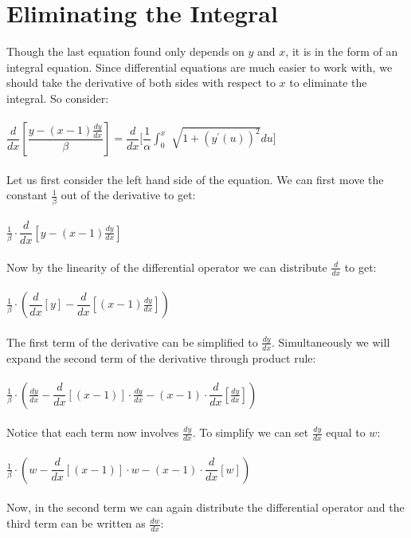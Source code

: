 \documentclass[12pt]{article}
\begin{document}
	\section{Eliminating the Integral}
	
	\indent \indent Though the last equation found only depends on $y$ and $x$, it is in the form of an integral equation. Since differential equations are much easier to work with, we should take the derivative of both sides with respect to $x$ to eliminate the integral. So consider:
	\\
	\\
	$\dfrac{d}{dx}[\dfrac{y - (x-1)\frac{dy}{dx}}{\beta}]=\dfrac{d}{dx}[\dfrac{1}{\alpha}${\Large $\int^x_0$} $ \sqrt{ 1 + (y^{\prime}(u))^{2}}du]$
	\\
	\\
	\indent Let us first consider the left hand side of the equation. We can first move the constant $\frac{1}{\beta}$ out of the derivative to get:
	\\
	\\
	$\frac{1}{\beta}\cdot\dfrac{d}{dx}[y - (x-1)\frac{dy}{dx}]$ 
	\\
	\\
	\indent Now by the linearity of the differential operator we can distribute $\frac{d}{dx}$ to get:
	\\
	\\
	$\frac{1}{\beta}\cdot(\dfrac{d}{dx}[y] - \dfrac{d}{dx}[(x-1)\frac{dy}{dx}])$\\
	\\
	\indent The first term of the derivative can be simplified to $\frac{dy}{dx}$. Simultaneously we will expand the second term of the derivative through product rule:
	\\
	\\
	$\frac{1}{\beta}\cdot(\frac{dy}{dx} - \dfrac{d}{dx}[(x-1)]\cdot\frac{dy}{dx} -(x-1)\cdot\dfrac{d}{dx}[\frac{dy}{dx}] )$
	\\
	\\
	\indent Notice that each term now involves $\frac{dy}{dx}$. To simplify we can set $\frac{dy}{dx}$ equal to $w$:
	\\
	\\
	$\frac{1}{\beta}\cdot(w - \dfrac{d}{dx}[(x-1)]\cdot w -(x-1)\cdot\dfrac{d}{dx}[w] )$
	\\
	\\
	\indent Now, in the second term we can again distribute the differential operator and the third term can be written as $\frac{dw}{dx}$:
	\\
	\\
\end{document}
